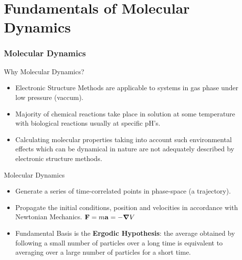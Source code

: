 \documentclass[slidestop,mathserif,compress,xcolor=svgnames]{beamer}
\newenvironment{ablock}[0]
{
\begin{beamerboxesrounded}[upper=uppercol,lower=lowercol,shadow=true]}
{\end{beamerboxesrounded}}
\newenvironment{bblock}[0]
{
\begin{beamerboxesrounded}[upper=uppercol1,lower=lowercol1,shadow=true]}
{\end{beamerboxesrounded}}
\begin{document}
\section{Fundamentals of Molecular Dynamics}
\begin{frame}
  \frametitle{\small Molecular Dynamics}
  \begin{ablock}{Why Molecular Dynamics?}
    \begin{itemize}
    \item Electronic Structure Methods are applicable to systems in gas phase under low pressure (vaccum).
    \item Majority of chemical reactions take place in solution at some temperature with biological reactions usually at specific pH's.
    \item Calculating molecular properties taking into account such environmental effects which can be dynamical in nature are not adequately described by electronic structure methods.
    \end{itemize}
  \end{ablock}
  
  \begin{bblock}{Molecular Dynamics}
    \begin{itemize}
    \item Generate a series of time-correlated points in phase-space (a trajectory).
    \item Propagate the initial conditions, position and velocities in accordance with Newtonian Mechanics. ${\bf F}=m{\bf a}=-{\boldsymbol\nabla}V$
    \item Fundamental Basis is the \textbf{Ergodic Hypothesis}: the average obtained by following a small number of particles over a
      long time is equivalent to averaging over a large number of particles for a short time.
    \end{itemize}
  \end{bblock}
\end{frame}
\end{document}
